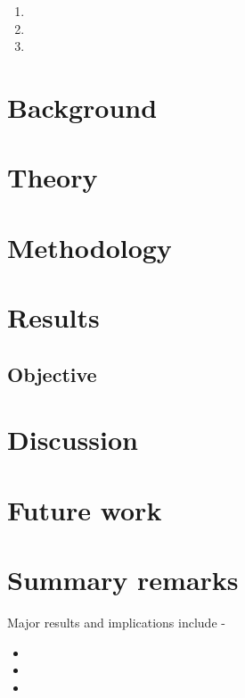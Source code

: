 \documentclass[11pt,a4paper]{article}
\begin{document}
\begin{enumerate}[topsep=0pt,itemsep=-0.75ex,partopsep=1ex,parsep=1ex]
    \item 
    \item  
    \item 
\end{enumerate}

\newpage

\section{Background} \label{sec-bak}

\newpage

\section{Theory} \label{sec-theo}

\newpage

\section{Methodology} \label{sec-meth}

\newpage

\section{Results} \label{sec-res}
\subsection{Objective} \label{sec-obj}

\newpage

\section{Discussion} \label{sec-disc}

\newpage

\section{Future work} \label{sec-fwk}

\newpage

\section{Summary remarks} \label{sec-sum}

Major results and implications include - 
\begin{itemize}[topsep=0pt,itemsep=-0.75ex,partopsep=1ex,parsep=1ex]
    \item
    \item
    \item
\end{itemize}
\end{document}
